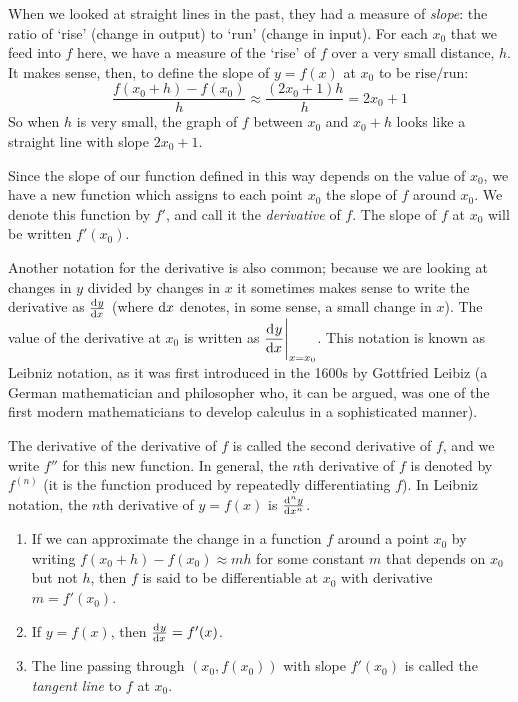 When we looked at straight lines in the past, they had a measure of \emph{slope}: the ratio of `rise' (change in output) to `run'
(change in input). For each $ x_0 $ that we feed into $ f $ here, we have a measure of the `rise' of $ f $ over a very small distance, $ h $.
It makes sense, then, to define the slope of $ y = f(x) $ at $ x_0 $ to be $\text{rise}/\text{run}$:
\begin{equation}
  \frac{f(x_0 + h) - f(x_0)}{h} \approx \frac{(2x_0 + 1)h}{h} = 2x_0 + 1
\end{equation}
So when $ h $ is very small, the graph of $ f $ between $ x_0 $ and $ x_0 + h $ looks like a straight line with slope $ 2x_0 + 1 $.

Since the slope of our function defined in this way depends on the value of $ x_0 $, we have a new function which assigns to each point $ x_0 $
the slope of $ f $ around $ x_0 $. We denote this function by $ f' $, and call it the \emph{derivative} of $ f $. The slope of $ f $ at $ x_0 $
will be written $ f'(x_0) $.

Another notation for the derivative is also common; because we are looking at changes in $ y $ divided by changes in $ x $ it sometimes
makes sense to write the derivative as $ \od{y}{x} $ (where $ \dif{x} $ denotes, in some sense, a small change in $ x $). The value of the
derivative at $ x_0 $ is written as $ \eval{\dod{y}{x}}_{x = x_0} $. This notation is known as Leibniz notation, as it was first introduced
in the 1600s by Gottfried Leibiz (a German mathematician and philosopher who, it can be argued, was one of the first modern mathematicians
to develop calculus in a sophisticated manner).

The derivative of the derivative of $ f $ is called the second derivative of $ f $, and we write $ f'' $ for this new function. In general,
the $ n$th derivative of $ f $ is denoted by $ f^{(n)} $ (it is the function produced by repeatedly differentiating $ f $). In Leibniz
notation, the $ n$th derivative of $ y = f(x) $ is $ \od[n]{y}{x} $.

\begin{defn}
  \begin{enumerate}
    \item If we can approximate the change in a function $ f $ around a point $ x_0 $ by writing $ f(x_0 + h) - f(x_0) \approx m h $
          for some constant $ m $ that depends on $ x_0 $ but not $ h $, then $ f $ is said to be differentiable at $ x_0 $
          with derivative $ m = f'(x_0) $.
    \item If $ y = f(x) $, then $ \od{y}{x} = f'(x) $.
    \item The line passing through $ (x_0,f(x_0)) $ with slope $ f'(x_0) $ is called the \emph{tangent line} to $ f $ at $ x_0 $.
  \end{enumerate}
\end{defn}

